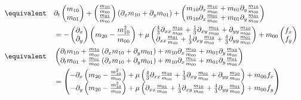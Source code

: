 \begin{equation*}
\begin{aligned}
\\
\equivalent \quad
&\partial_t \begin{pmatrix}m_{10} \\m_{01}  \end{pmatrix}
+ \begin{pmatrix}\frac{m_{10}}{m_{00}} \\\frac{m_{01}}{m_{00}}  \end{pmatrix}
\left(\partial_x m_{10} + \partial_y  m_{01} \right)
+ \begin{pmatrix}m_{10}\partial_x \frac{m_{10}}{m_{00}} + m_{01}\partial_y \frac{m_{10}}{m_{00}} \\
  m_{10}\partial_x\frac{m_{01}}{m_{00}} + m_{01}\partial_y\frac{m_{01}}{m_{00}}  \end{pmatrix}
\\&= - \begin{pmatrix}\partial_x \\\partial_y  \end{pmatrix} \left(m_{20} - \frac{ m_{10}^2 }{ m_{00} } \right)
+ \mu
\begin{pmatrix}
\frac{4}{3}\partial_{xx} \frac{m_{10}}{m_{00}} + \frac{1}{3}\partial_{xy} \frac{m_{01}}{m_{00}} + \partial_{yy} \frac{m_{10}}{m_{00}} \\
\partial_{xx} \frac{m_{01}}{m_{00}} +\frac{1}{3}\partial_{xy} \frac{m_{10}}{m_{00}} + \frac{4}{3}\partial_{yy} \frac{m_{01}}{m_{00}}
\end{pmatrix} + m_{00} \begin{pmatrix}f_x\\f_y \end{pmatrix}
\\
\equivalent \quad
& \begin{pmatrix}
\partial_t m_{10}
+ \frac{m_{10}}{m_{00}}\left(\partial_x m_{10} + \partial_y  m_{01} \right)
+ m_{10}\partial_x \frac{m_{10}}{m_{00}} + m_{01}\partial_y \frac{m_{10}}{m_{00}}
\\
\partial_t m_{01}
+ \frac{m_{01}}{m_{00}} \left(\partial_x m_{10} + \partial_y  m_{01} \right)
+ m_{10}\partial_x\frac{m_{01}}{m_{00}} + m_{01}\partial_y\frac{m_{01}}{m_{00}}
\end{pmatrix}
\\&=  \begin{pmatrix}
-\partial_x \left(m_{20} - \frac{ m_{10}^2 }{ m_{00} } \right)
+\mu\left(
\frac{4}{3}\partial_{xx} \frac{m_{10}}{m_{00}} + \frac{1}{3}\partial_{xy} \frac{m_{01}}{m_{00}} + \partial_{yy} \frac{m_{10}}{m_{00}} \right)
+ m_{00}f_x
\\
-\partial_y  \left(m_{20} - \frac{ m_{10}^2 }{ m_{00} } \right)
+ \mu
\left(
\partial_{xx} \frac{m_{01}}{m_{00}} +\frac{1}{3}\partial_{xy} \frac{m_{10}}{m_{00}} + \frac{4}{3}\partial_{yy} \frac{m_{01}}{m_{00}}
\right)
+ m_{00} f_y \end{pmatrix}
\end{aligned}
\end{equation*}
